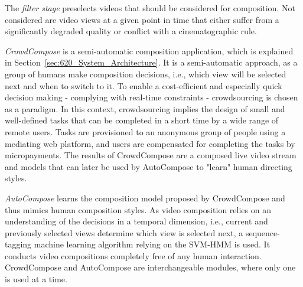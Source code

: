 The \emph{filter stage} preselects videos that should be considered for composition.
Not considered are video views at a given point in time that either suffer from a significantly degraded quality or conflict with a cinematographic rule.

\emph{CrowdCompose} is a semi-automatic composition application, which is explained in Section~\ref{sec:620_System_Architecture}.
It is a semi-automatic approach, as a group of humans make composition decisions, i.e., which view will be selected next and when to switch to it.
To enable a cost-efficient and especially quick decision making - complying with real-time constraints - crowdsourcing is chosen as a paradigm.
In this context, crowdsourcing implies the design of small and well-defined tasks that can be completed in a short time by a wide range of remote users. 
Tasks are provisioned to an anonymous group of people using a mediating web platform, and users are compensated for completing the tasks by micropayments.
The results of CrowdCompose are a composed live video stream and models that can later be used by AutoCompose to "learn" human directing styles.

\emph{AutoCompose} learns the composition model proposed by CrowdCompose and thus mimics human composition styles.
As video composition relies on an understanding of the decisions in a temporal dimension, i.e., current and previously selected views determine which view is selected next, a sequence-tagging machine learning algorithm relying on the \ac{SVM-HMM} is used.
It conducts video compositions completely free of any human interaction.
CrowdCompose and AutoCompose are interchangeable modules, where only one is used at a time.